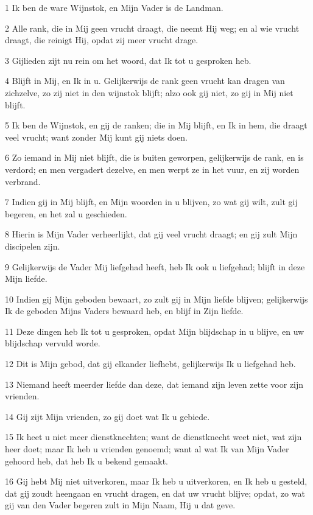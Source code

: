 \par 1 Ik ben de ware Wijnstok, en Mijn Vader is de Landman.
\par 2 Alle rank, die in Mij geen vrucht draagt, die neemt Hij weg; en al wie vrucht draagt, die reinigt Hij, opdat zij meer vrucht drage.
\par 3 Gijlieden zijt nu rein om het woord, dat Ik tot u gesproken heb.
\par 4 Blijft in Mij, en Ik in u. Gelijkerwijs de rank geen vrucht kan dragen van zichzelve, zo zij niet in den wijnstok blijft; alzo ook gij niet, zo gij in Mij niet blijft.
\par 5 Ik ben de Wijnstok, en gij de ranken; die in Mij blijft, en Ik in hem, die draagt veel vrucht; want zonder Mij kunt gij niets doen.
\par 6 Zo iemand in Mij niet blijft, die is buiten geworpen, gelijkerwijs de rank, en is verdord; en men vergadert dezelve, en men werpt ze in het vuur, en zij worden verbrand.
\par 7 Indien gij in Mij blijft, en Mijn woorden in u blijven, zo wat gij wilt, zult gij begeren, en het zal u geschieden.
\par 8 Hierin is Mijn Vader verheerlijkt, dat gij veel vrucht draagt; en gij zult Mijn discipelen zijn.
\par 9 Gelijkerwijs de Vader Mij liefgehad heeft, heb Ik ook u liefgehad; blijft in deze Mijn liefde.
\par 10 Indien gij Mijn geboden bewaart, zo zult gij in Mijn liefde blijven; gelijkerwijs Ik de geboden Mijns Vaders bewaard heb, en blijf in Zijn liefde.
\par 11 Deze dingen heb Ik tot u gesproken, opdat Mijn blijdschap in u blijve, en uw blijdschap vervuld worde.
\par 12 Dit is Mijn gebod, dat gij elkander liefhebt, gelijkerwijs Ik u liefgehad heb.
\par 13 Niemand heeft meerder liefde dan deze, dat iemand zijn leven zette voor zijn vrienden.
\par 14 Gij zijt Mijn vrienden, zo gij doet wat Ik u gebiede.
\par 15 Ik heet u niet meer dienstknechten; want de dienstknecht weet niet, wat zijn heer doet; maar Ik heb u vrienden genoemd; want al wat Ik van Mijn Vader gehoord heb, dat heb Ik u bekend gemaakt.
\par 16 Gij hebt Mij niet uitverkoren, maar Ik heb u uitverkoren, en Ik heb u gesteld, dat gij zoudt heengaan en vrucht dragen, en dat uw vrucht blijve; opdat, zo wat gij van den Vader begeren zult in Mijn Naam, Hij u dat geve.
